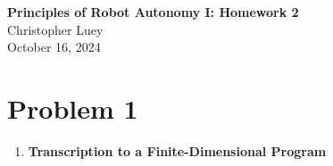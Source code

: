 \documentclass [11pt]{article}
\newcommand{\authorname}{Christopher Luey}
\newcommand{\datenumber}{October 16, 2024}
\newcommand{\assignmentID}{Homework 2}
\newcommand{\coursename}{Principles of Robot Autonomy I: }
\begin{document}
\pagestyle{fancy}

\begin{center}
    \Large \textbf{\coursename \assignmentID}\\
    \small \authorname\\
    \small \datenumber
\end{center}


\section*{Problem 1}
    \begin{enumerate}[label=(\roman*)]
        \item \textbf{Transcription to a Finite-Dimensional Program}


\end{enumerate}
\end{document}

